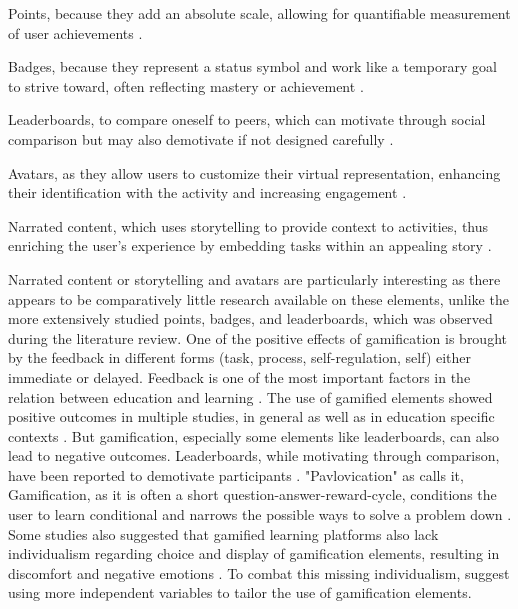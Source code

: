 \begin{APAitemize}
    \item Points, because they add an absolute scale, allowing for quantifiable measurement of user achievements \parencite{hamariDoesGamificationWork2014}.
    \item Badges, because they represent a status symbol and work like a temporary goal to strive toward, often reflecting mastery or achievement \parencite{gonzalezGamificationIntelligentTutoring2014}.
    \item Leaderboards, to compare oneself to peers, which can motivate through social comparison but may also demotivate if not designed carefully \parencite{hamariDoesGamificationWork2014, almeidaSystematicMappingNegative2021}.
    \item Avatars, as they allow users to customize their virtual representation, enhancing their identification with the activity and increasing engagement \parencite{gonzalezGamificationIntelligentTutoring2014}.
    \item Narrated content, which uses storytelling to provide context to activities, thus enriching the user's experience by embedding tasks within an appealing story \parencite{gonzalezGamificationIntelligentTutoring2014}.
\end{APAitemize}
Narrated content or storytelling and avatars are particularly interesting as there appears to be comparatively little research available on these elements, unlike the more extensively studied points, badges, and leaderboards, which was observed during the literature review.
One of the positive effects of gamification is brought by the feedback in different forms (task, process, self-regulation, self) either immediate or delayed.
Feedback is one of the most important factors in the relation between education and learning \textcite{sailerGamificationLearningMetaanalysis2020}.
The use of gamified elements showed positive outcomes in multiple studies, in general \parencite{hamariDoesGamificationWork2014} as well as in education specific contexts \parencite{sailerGamificationLearningMetaanalysis2020}.
But gamification, especially some elements like leaderboards, can also lead to negative outcomes. Leaderboards, while motivating through comparison, have been reported to demotivate participants \parencite{almeidaSystematicMappingNegative2021}.
"Pavlovication" as \textcite{klabbersArchitectureGameScience2018} calls it, Gamification, as it is often a short question-answer-reward-cycle, conditions the user to learn conditional and narrows the possible ways to solve a problem down \parencite{klabbersArchitectureGameScience2018}.
Some studies also suggested that gamified learning platforms also lack individualism regarding choice and display of gamification elements, resulting in discomfort and negative emotions \parencite{santosDoesGenderStereotype2023}.
To combat this missing individualism, \textcite{oliveiraTailoredGamificationEducation2023,dehghanzadehUsingGamificationSupport2024} suggest using more independent variables to tailor the use of gamification elements.
